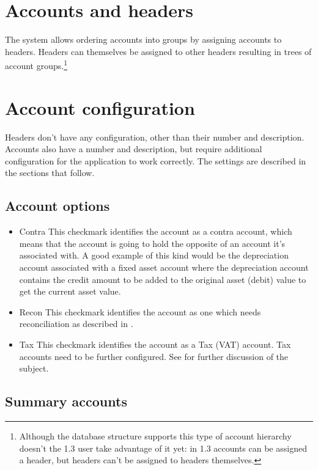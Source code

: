 \section{Accounts and headers}

The system allows ordering accounts into groups by assigning accounts to headers. Headers
can themselves be assigned to other headers resulting in trees of account groups.\footnote{Although the database structure supports this type of account hierarchy
doesn't the 1.3 user take advantage of it yet: in 1.3 accounts can be assigned a header,
but headers can't be assigned to headers themselves.}



\section{Account configuration}

Headers don't have any configuration, other than their number and description. Accounts also
have a number and description, but require additional configuration for the application to work
correctly. The settings are described in the sections that follow.

\subsection{Account options}
\label{sec:AccountOptions}
\begin{itemize}
\item Contra This checkmark identifies the account as a contra account, which means
   that the account is going to hold the opposite of an account it's associated with.
   A good example of this kind would be the depreciation account associated with a fixed
   asset account where the depreciation account contains the credit amount to be added to
   the original asset (debit) value to get the current asset value.
\item Recon This checkmark identifies the account as one which needs reconciliation as
   described in .
\item Tax This checkmark identifies the account as a Tax (VAT) account. Tax accounts need
   to be further configured. See  for further discussion of the
   subject.
   \label{item:AccountOptionsTax}
\end{itemize}

\subsection{Summary accounts}
\label{subsec:summary-accounts}

